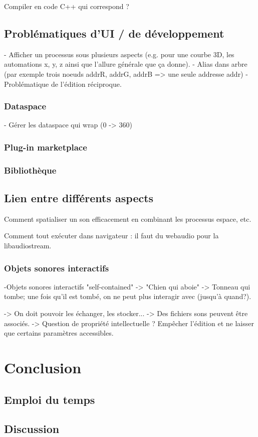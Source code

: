 \documentclass[french,a4paper,openany,12pt]{book}
\begin{document}
Compiler en code C++ qui correspond ? 

\section{Problématiques d'UI / de développement}
- Afficher un processus sous plusieurs aspects (e.g. pour une courbe 3D, les automations x, y, z ainsi que l'allure générale que ça donne).
- Alias dans arbre (par exemple trois noeuds addrR, addrG, addrB => une seule addresse addr)
- Problématique de l'édition réciproque.
\subsection{Dataspace}
- Gérer les dataspace qui wrap (0 -> 360)
\subsection{Plug-in marketplace}
\subsection{Bibliothèque}

\section{Lien entre différents aspects}
Comment spatialiser un son efficacement en combinant les processus espace, etc.

Comment tout exécuter dans navigateur : il faut du webaudio pour la libaudiostream.

\subsection{Objets sonores interactifs}
-Objets sonores interactifs "self-contained"
-> "Chien qui aboie" 
-> Tonneau qui tombe; une fois qu'il est tombé, on ne peut plus interagir avec (jusqu'à quand?).

-> On doit pouvoir les échanger, les stocker...
-> Des fichiers sons peuvent être associés.
-> Question de propriété intellectuelle ? 
Empêcher l'édition et ne laisser que certains paramètres accessibles.
\chapter{Conclusion}
\section{Emploi du temps}
\section{Discussion}
\end{document}

